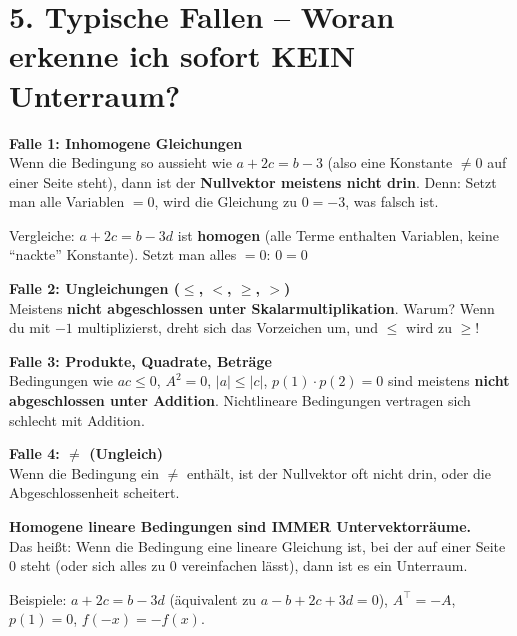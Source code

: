 \documentclass[a4paper,12pt]{article}
\begin{document}
\section*{5. Typische Fallen -- Woran erkenne ich sofort KEIN Unterraum?}

\begin{merkbox}[title={Rote Flaggen -- KEIN Unterraum}]
\textbf{Falle 1: Inhomogene Gleichungen}\\
Wenn die Bedingung so aussieht wie $a + 2c = b - 3$ (also eine Konstante $\neq 0$ auf einer Seite steht), dann ist der \textbf{Nullvektor meistens nicht drin}. Denn: Setzt man alle Variablen $= 0$, wird die Gleichung zu $0 = -3$, was falsch ist.

\medskip
Vergleiche: $a + 2c = b - 3d$ ist \textbf{homogen} (alle Terme enthalten Variablen, keine ``nackte'' Konstante). Setzt man alles $= 0$: $0 = 0$ \checkmark

\bigskip
\textbf{Falle 2: Ungleichungen ($\leq$, $<$, $\geq$, $>$)}\\
Meistens \textbf{nicht abgeschlossen unter Skalarmultiplikation}. Warum? Wenn du mit $-1$ multiplizierst, dreht sich das Vorzeichen um, und $\leq$ wird zu $\geq$!

\bigskip
\textbf{Falle 3: Produkte, Quadrate, Betr\"age}\\
Bedingungen wie $ac \leq 0$, $A^2 = 0$, $|a| \leq |c|$, $p(1) \cdot p(2) = 0$ sind meistens \textbf{nicht abgeschlossen unter Addition}. Nichtlineare Bedingungen vertragen sich schlecht mit Addition.

\bigskip
\textbf{Falle 4: $\neq$ (Ungleich)}\\
Wenn die Bedingung ein $\neq$ enth\"alt, ist der Nullvektor oft nicht drin, oder die Abgeschlossenheit scheitert.
\end{merkbox}

\begin{merkbox}[title={Gr\"une Flagge -- JA, Unterraum!}]
\textbf{Homogene lineare Bedingungen sind IMMER Untervektorr\"aume.}\\
Das hei\ss t: Wenn die Bedingung eine lineare Gleichung ist, bei der auf einer Seite $0$ steht (oder sich alles zu $0$ vereinfachen l\"asst), dann ist es ein Unterraum.

\medskip
Beispiele: $a + 2c = b - 3d$ (\"aquivalent zu $a - b + 2c + 3d = 0$), $A^\top = -A$, $p(1) = 0$, $f(-x) = -f(x)$.
\end{merkbox}
\end{document}
